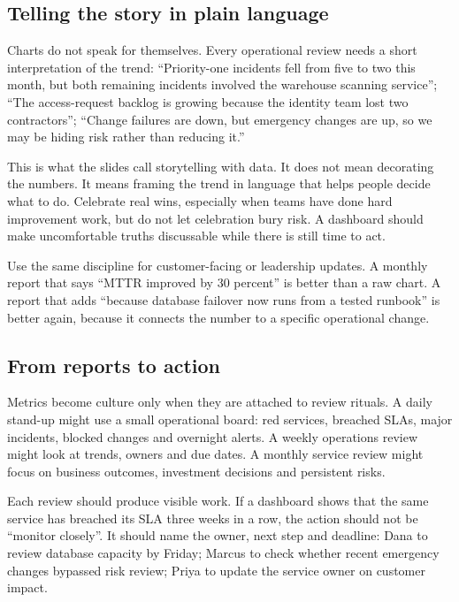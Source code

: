 \subsection{Telling the story in plain language}


Charts do not speak for themselves. Every operational review needs a short interpretation of the trend: ``Priority-one incidents fell from five to two this month, but both remaining incidents involved the warehouse scanning service''; ``The access-request backlog is growing because the identity team lost two contractors''; ``Change failures are down, but emergency changes are up, so we may be hiding risk rather than reducing it.''


This is what the slides call storytelling with data. It does not mean decorating the numbers. It means framing the trend in language that helps people decide what to do. Celebrate real wins, especially when teams have done hard improvement work, but do not let celebration bury risk. A dashboard should make uncomfortable truths discussable while there is still time to act.


Use the same discipline for customer-facing or leadership updates. A monthly report that says ``MTTR improved by 30 percent'' is better than a raw chart. A report that adds ``because database failover now runs from a tested runbook'' is better again, because it connects the number to a specific operational change.



\subsection{From reports to action}


Metrics become culture only when they are attached to review rituals. A daily stand-up might use a small operational board: red services, breached SLAs, major incidents, blocked changes and overnight alerts. A weekly operations review might look at trends, owners and due dates. A monthly service review might focus on business outcomes, investment decisions and persistent risks.


Each review should produce visible work. If a dashboard shows that the same service has breached its SLA three weeks in a row, the action should not be ``monitor closely''. It should name the owner, next step and deadline: Dana to review database capacity by Friday; Marcus to check whether recent emergency changes bypassed risk review; Priya to update the service owner on customer impact.


